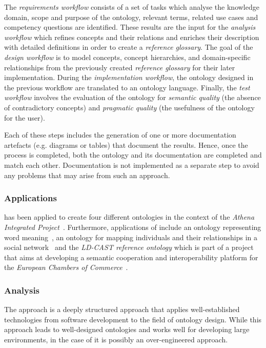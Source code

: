 The \emph{requirements workflow} consists of a set of tasks which analyse the knowledge domain, scope and purpose of the ontology, relevant terms, related use cases and competency questions are identified. These results are the input for the \emph{analysis workflow} which refines concepts and their relations and enriches their description with detailed definitions in order to create a \emph{reference glossary}. The goal of the \emph{design workflow} is to model concepts, concept hierarchies, and domain-specific relationships from the previously created \emph{reference glossary} for their later implementation.
During the \emph{implementation workflow}, the ontology designed in the previous workflow are translated to an ontology language. Finally, the \emph{test workflow} involves the evaluation of the ontology for \emph{semantic quality} (the absence of contradictory concepts) and \emph{pragmatic quality} (the usefulness of the ontology for the user).

Each of these steps includes the generation of one or more documentation artefacts (e.g. diagrams or tables) that document the results. Hence, once the  process is completed, both the ontology and its documentation are completed and match each other. Documentation is not implemented as a separate step to avoid any problems that may arise from such an approach.

\subsubsection{Applications}

 has been applied to create four different ontologies in the context of the \emph{Athena Integrated Project}~\cite{AthenaProject}. Furthermore, applications of  include an ontology representing word meaning~\cite{upon_example1}, an ontology for mapping individuals and their relationships in a social network~\cite{upon_example2} and the \emph{LD-CAST reference ontology} which is part of a project that aims at developing a semantic cooperation and interoperability platform for the \emph{European Chambers of Commerce}~\cite{upon_example3,ld_cast}.

\subsubsection{Analysis}

The  approach is a deeply structured approach that applies well-established technologies from software development to the field of ontology design. While this approach leads to well-designed ontologies and works well for developing large environments, in the case of \thinkhome it is possibly an over-engineered approach.

